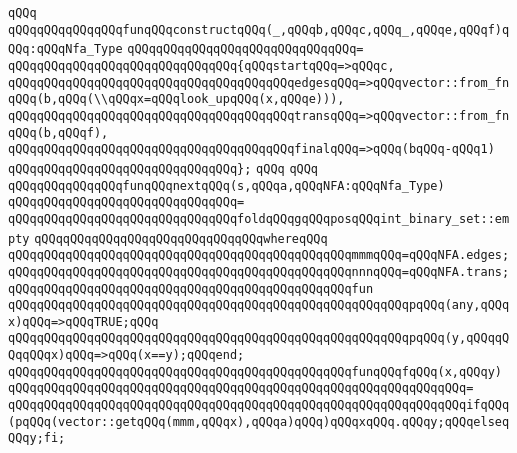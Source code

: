 \verb|qQQq|\newline
\verb|qQQqqQQqqQQqqQQqfunqQQqconstructqQQq(_,qQQqb,qQQqc,qQQq_,qQQqe,qQQqf)qQQq:qQQqNfa_Type|\newline
\verb|qQQqqQQqqQQqqQQqqQQqqQQqqQQqqQQq=|\newline
\verb|qQQqqQQqqQQqqQQqqQQqqQQqqQQqqQQq{qQQqstartqQQq=>qQQqc,|\newline
\verb|qQQqqQQqqQQqqQQqqQQqqQQqqQQqqQQqqQQqqQQqedgesqQQq=>qQQqvector::from_fnqQQq(b,qQQq(\\qQQqx=qQQqlook_upqQQq(x,qQQqe))),|\newline
\verb|qQQqqQQqqQQqqQQqqQQqqQQqqQQqqQQqqQQqqQQqtransqQQq=>qQQqvector::from_fnqQQq(b,qQQqf),|\newline
\verb|qQQqqQQqqQQqqQQqqQQqqQQqqQQqqQQqqQQqqQQqfinalqQQq=>qQQq(bqQQq-qQQq1)|\newline
\verb|qQQqqQQqqQQqqQQqqQQqqQQqqQQqqQQq};|\newline
\verb|qQQq|\newline
\verb|qQQq|\newline
\verb|qQQqqQQqqQQqqQQqfunqQQqnextqQQq(s,qQQqa,qQQqNFA:qQQqNfa_Type)|\newline
\verb|qQQqqQQqqQQqqQQqqQQqqQQqqQQqqQQq=|\newline
\verb|qQQqqQQqqQQqqQQqqQQqqQQqqQQqqQQqfoldqQQqgqQQqposqQQqint_binary_set::empty|\newline
\verb|qQQqqQQqqQQqqQQqqQQqqQQqqQQqqQQqwhereqQQq|\newline
\newline
\verb|qQQqqQQqqQQqqQQqqQQqqQQqqQQqqQQqqQQqqQQqqQQqqQQqmmmqQQq=qQQqNFA.edges;|\newline
\verb|qQQqqQQqqQQqqQQqqQQqqQQqqQQqqQQqqQQqqQQqqQQqqQQqnnnqQQq=qQQqNFA.trans;|\newline
\newline
\verb|qQQqqQQqqQQqqQQqqQQqqQQqqQQqqQQqqQQqqQQqqQQqqQQqfun|\newline
\verb|qQQqqQQqqQQqqQQqqQQqqQQqqQQqqQQqqQQqqQQqqQQqqQQqqQQqqQQqpqQQq(any,qQQqx)qQQq=>qQQqTRUE;qQQq|\newline
\verb|qQQqqQQqqQQqqQQqqQQqqQQqqQQqqQQqqQQqqQQqqQQqqQQqqQQqqQQqpqQQq(y,qQQqqQQqqQQqx)qQQq=>qQQq(x==y);qQQqend;|\newline
\newline
\verb|qQQqqQQqqQQqqQQqqQQqqQQqqQQqqQQqqQQqqQQqqQQqqQQqfunqQQqfqQQq(x,qQQqy)|\newline
\verb|qQQqqQQqqQQqqQQqqQQqqQQqqQQqqQQqqQQqqQQqqQQqqQQqqQQqqQQqqQQqqQQq=|\newline
\verb|qQQqqQQqqQQqqQQqqQQqqQQqqQQqqQQqqQQqqQQqqQQqqQQqqQQqqQQqqQQqqQQqifqQQq(pqQQq(vector::getqQQq(mmm,qQQqx),qQQqa)qQQq)qQQqxqQQq.qQQqy;qQQqelseqQQqy;fi;|\newline

